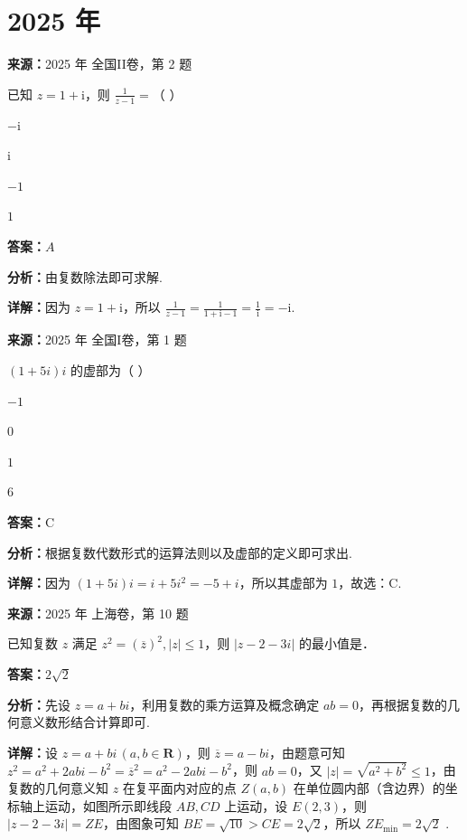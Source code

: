 \section*{2025 年}

\begin{question}[points=5]
\textbf{来源：}2025 年 全国II卷，第 2 题\par
已知 $z=1+\mathrm{i}$，则 $\frac{1}{z-1}=$（ ）
\begin{choices}
  \item $-\mathrm{i}$
  \item $\mathrm{i}$
  \item $-1$
  \item $1$
\end{choices}
\begin{solution}
\textbf{答案：}$A$

\textbf{分析：}由复数除法即可求解.

\textbf{详解：}因为 $z=1+\mathrm{i}$，所以 $\frac{1}{z-1}=\frac{1}{1+\mathrm{i}-1}=\frac{1}{\mathrm{i}}=-\mathrm{i}$.
\end{solution}
\end{question}

\begin{question}[points=5]
\textbf{来源：}2025 年 全国I卷，第 1 题\par
$(1+5i)i$ 的虚部为（ ）
\begin{choices}
  \item $-1$
  \item $0$
  \item $1$
  \item $6$
\end{choices}
\begin{solution}
\textbf{答案：}C

\textbf{分析：}根据复数代数形式的运算法则以及虚部的定义即可求出.

\textbf{详解：}因为 $(1+5i)i = i + 5i^2 = -5 + i$，所以其虚部为 $1$，故选：C.
\end{solution}
\end{question}

\begin{question}[points=5]
\textbf{来源：}2025 年 上海卷，第 10 题\par
已知复数 $z$ 满足 $z^2 = (\overline{z})^2, |z| \leq 1$，则 $|z - 2 - 3i|$ 的最小值是．
\fillin[{$2\sqrt{2}$}]
\begin{solution}
\textbf{答案：}$2\sqrt{2}$

\textbf{分析：}先设 $z = a + bi$，利用复数的乘方运算及概念确定 $ab = 0$，再根据复数的几何意义数形结合计算即可.

\textbf{详解：}设 $z = a + bi\,(a,b \in \mathbf{R})$，则 $\overline{z} = a - bi$，由题意可知 $z^2 = a^2 + 2abi - b^2 = \overline{z}^2 = a^2 - 2abi - b^2$，则 $ab = 0$，又 $|z| = \sqrt{a^2 + b^2} \leq 1$，由复数的几何意义知 $z$ 在复平面内对应的点 $Z(a,b)$ 在单位圆内部（含边界）的坐标轴上运动，如图所示即线段 $AB, CD$ 上运动，设 $E(2,3)$，则 $|z-2-3i| = ZE$，由图象可知 $BE = \sqrt{10} > CE = 2\sqrt{2}$，所以 $ZE_{\min} = 2\sqrt{2}$ .
\end{solution}
\end{question}

